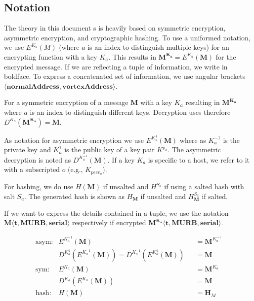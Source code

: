 \documentclass[acmsmall, screen, review]{acmart}
\begin{document}
\subsection{Notation \label{sec:encNot}}
The theory in this document s is heavily based on symmetric encryption, asymmetric encryption, and cryptographic hashing. To use a uniformed notation, we use $E^{K_a}(M)$ (where $a$ is an index to distinguish multiple keys) for an encrypting function with a key $K_a$. This results in $\mathbf{M^{K_a}}=E^{K_a}(\mathbf{M})$ for the encrypted message. If we are reflecting a tuple of information, we write in boldface. To express a concatenated set of information, we use angular brackets $\mathbf{\langle normalAddress,vortexAddress\rangle }$. 

For a symmetric encryption of a message $\mathbf{M}$ with a key $K_a$ resulting in $\mathbf{M^{K_a}}$ where $a$ is an index to distinguish different keys. Decryption uses therefore $D^{K_a}(\mathbf{M^{K_a}})=\mathbf{M}$.

As notation for asymmetric encryption we use $E^{K^{1}_a}(\mathbf{M})$ where as $K^{-1}_a$ is the private key and $K^{1}_a$ is the public key of a key pair $K^{p_a}$. The asymmetric decryption is noted as $D^{K^{-1}_a}(\mathbf{M})$. If a key $K_a$ is specific to a host, we refer to it with a subscripted $o$ (e.g., $K_{peer_o}$).

For hashing, we do use $H(\mathbf{M})$ if unsalted and $H^{S_a}$ if using a salted hash with salt $S_a$. The generated hash is shown as $H_\mathbf{M}$ if unsalted and $H^{S_a}_\mathbf{M}$ if salted.

If we want to express the details contained in a tuple, we use the notation $\mathbf{M\langle t,MURB,serial\rangle}$ respectively if encrypted $\mathbf{M^{K_{a}}\langle t,MURB,serial\rangle}$.

\begin{align*}
\text{asym:}         & E^{K^{-1}_a}\left(\mathbf{M}\right)                           && =\mathbf{M}^{K^{-1}_a}\\
& D^{K^{1}_a}\left(E^{K^{-1}_a}\left(\mathbf{M}\right)\right) = D^{K^{-1}_a}\left(E^{K^{1}_a}\left(\mathbf{M}\right)\right)        && =\mathbf{M}\\
\text{sym:}          & E^{K_a}\left(\mathbf{M}\right)                                && =\mathbf{M}^{K_a}\\
& D^{K_a}\left(E^{K_a}\left(\mathbf{M}\right)\right)               && =\mathbf{M}\\
\text{hash:}         & H\left(\mathbf{M}\right)                                      && =\mathbf{H}_M
\end{align*}
\end{document}
